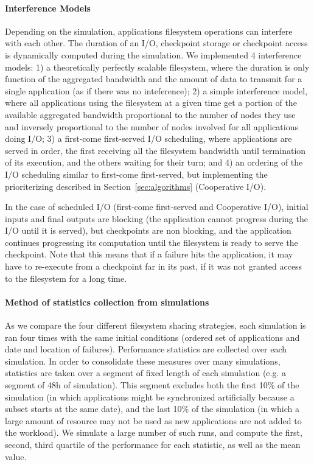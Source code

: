 \documentclass[conference]{IEEEtran}
\begin{document}
\paragraph*{Interference Models}
Depending on the simulation, applications filesystem operations can
interfere with each other. The duration of an I/O, checkpoint storage
or checkpoint access is dynamically computed during the simulation. We
implemented 4 interference models: 1) a theoretically perfectly scalable
filesystem, where the duration is only function of the aggregated
bandwidth and the amount of data to transmit for a single application
(as if there was no inteference); 2) a simple interference model,
where all applications using the filesystem at a given time get a
portion of the available aggregated bandwidth proportional to the
number of nodes they use and inversely proportional to the number of
nodes involved for all applications doing I/O; 3) a first-come
first-served I/O scheduling, where applications are served in order,
the first receiving all the filesystem bandwidth until termination of
its execution, and the others waiting for their turn; and 4) an
ordering of the I/O scheduling similar to first-come first-served, but
implementing the prioriterizing described in
Section~\ref{sec:algorithms} (Cooperative I/O).

In the case of scheduled I/O (first-come first-served and Cooperative
I/O), initial inputs and final outputs are blocking (the application
cannot progress during the I/O until it is served), but checkpoints
are non blocking, and the application continues progressing its
computation until the filesystem is ready to serve the
checkpoint. Note that this means that if a failure hits the
application, it may have to re-execute from a checkpoint far in its
past, if it was not granted access to the filesystem for a long time.

\paragraph*{Method of statistics collection from simulations}
As we compare the four different filesystem sharing strategies, each
simulation is ran four times with the same initial conditions (ordered
set of applications and date and location of failures). Performance
statistics are collected over each simulation. In order to consolidate
these measures over many simulations, statistics are taken over a
segment of fixed length of each simulation (e.g. a segment of
48h of simulation). This segment excludes both the first 10\% of the
simulation (in which applications might be synchronized artificially
because a subset starts at the same date), and the last 10\% of the
simulation (in which a large amount of resource may not be used as new
applications are not added to the workload). We simulate a large
number of such runs, and compute the first, second, third quartile of
the performance for each statistic, as well as the mean value.
\end{document}
